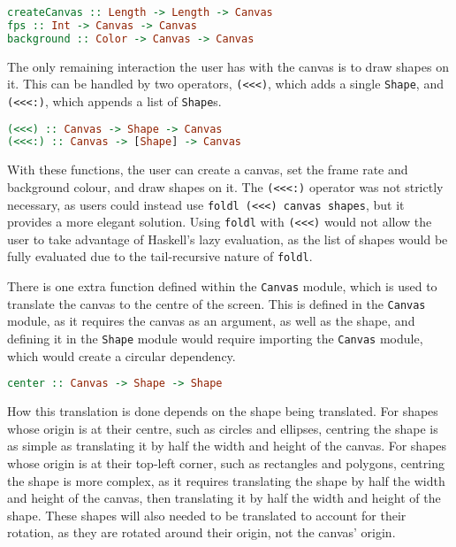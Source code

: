 \documentclass[../main.tex]{subfiles}
\begin{document}
        \begin{lstlisting}[language={Haskell}, label={lst:fps}, caption={The \texttt{createCanvas}, \texttt{fps} and 
            \texttt{backgrounds} functions.}]
createCanvas :: Length -> Length -> Canvas
fps :: Int -> Canvas -> Canvas
background :: Color -> Canvas -> Canvas\end{lstlisting}

        The only remaining interaction the user has with the canvas is to draw shapes
            on it.
        This can be handled by two operators, \texttt{(<<<)}, which adds a single
            \texttt{Shape}, and \texttt{(<<<:)}, which appends a list of \texttt{Shape}s.

        \begin{lstlisting}[language={Haskell}, label={lst:<<<}, caption={The operators to append a frame to the 
            canvas.}]
(<<<) :: Canvas -> Shape -> Canvas
(<<<:) :: Canvas -> [Shape] -> Canvas\end{lstlisting}

        With these functions, the user can create a canvas, set the frame rate and
            background colour, and draw shapes on it.
        The \texttt{(<<<:)} operator was not strictly necessary, as users could instead
            use \texttt{foldl (<<<) canvas shapes}, but it provides a more elegant
            solution.
        Using \texttt{foldl} with \texttt{(<<<)} would not allow the user to take
            advantage of Haskell's lazy evaluation, as the list of shapes would be fully
            evaluated due to the tail-recursive nature of \texttt{foldl}.

        There is one extra function defined within the \texttt{Canvas} module, which is
            used to translate the canvas to the centre of the screen.
        This is defined in the \texttt{Canvas} module, as it requires the canvas as an
            argument, as well as the shape, and defining it in the \texttt{Shape} module
            would require importing the \texttt{Canvas} module, which would create a
            circular dependency.

        \begin{lstlisting}[language={Haskell}, label={lst:centre}, caption={The \texttt{centre} function.}]
center :: Canvas -> Shape -> Shape\end{lstlisting}

        How this translation is done depends on the shape being translated.
        For shapes whose origin is at their centre, such as circles and ellipses,
            centring the shape is as simple as translating it by half the width and height
            of the canvas.
        For shapes whose origin is at their top-left corner, such as rectangles and
            polygons, centring the shape is more complex, as it requires translating the
            shape by half the width and height of the canvas, then translating it by half
            the width and height of the shape.
        These shapes will also needed to be translated to account for their rotation,
            as they are rotated around their origin, not the canvas' origin.
\end{document}
